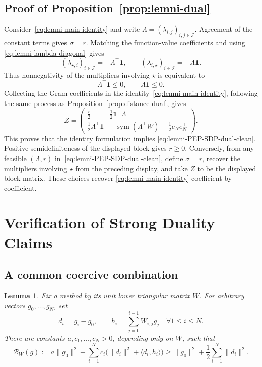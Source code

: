 \documentclass[11pt]{article}
\newtheorem{lemma}[thm]{Lemma}
\begin{document}
\subsection{Proof of Proposition~\ref{prop:lemni-dual}}
\label{app:lemni-dual}
Consider~\eqref{eq:lemni-main-identity} and write
$\Lambda=(\lambda_{i,j})_{i,j\in\mathcal I}$. Agreement of the constant terms
gives $\sigma=r$. Matching the function-value coefficients and using
\eqref{eq:lemni-lambda-diagonal} gives
\[
    (\lambda_{\star,i})_{i\in\mathcal I}
    =-\Lambda^\top\mathbf1,
    \qquad
    (\lambda_{i,\star})_{i\in\mathcal I}
    =-\Lambda\mathbf1.
\]
Thus nonnegativity of the multipliers involving $\star$ is equivalent to
\[
    \Lambda^\top\mathbf1\leq0,
    \qquad
    \Lambda\mathbf1\leq0.
\]
Collecting the Gram coefficients in the identity~\eqref{eq:lemni-main-identity}, following the same process as Proposition~\ref{prop:distance-dual}, gives
\[
Z=
\begin{pmatrix}
    \frac r2 & \frac12\mathbf1^\top\Lambda\\[1mm]
    \frac12\Lambda^\top\mathbf1
    &-\operatorname{sym}(\Lambda^\top W)-\frac12e_Ne_N^\top
\end{pmatrix}.
\]
This proves that the identity formulation implies
\eqref{eq:lemni-PEP-SDP-dual-clean}. Positive semidefiniteness of the
displayed block gives $r\geq0$. Conversely, from any feasible $(\Lambda,r)$
in~\eqref{eq:lemni-PEP-SDP-dual-clean}, define $\sigma=r$,
recover the multipliers involving $\star$ from the preceding display, and
take $Z$ to be the displayed block matrix. These choices recover
\eqref{eq:lemni-main-identity} coefficient by coefficient.



\section{Verification of Strong Duality Claims}
\subsection{A common coercive combination}

\begin{lemma}\label{lem:app-coercive-combination}
Fix a method by its unit lower triangular matrix $W$. For arbitrary vectors
$g_0,\ldots,g_N$, set
\[
 d_i=g_i-g_0,
 \qquad
 h_i=\sum_{j=0}^{i-1}W_{i,j}g_j
 \quad \forall 1\le i\le N.
\]
There are constants $a,c_1,\ldots,c_N>0$, depending only on $W$, such that
\begin{equation}\label{eq:app-positive-form}
 \mathcal B_W(g):=
 a\|g_0\|^2+
 \sum_{i=1}^Nc_i\bigl(\|d_i\|^2+\langle d_i,h_i\rangle\bigr)
 \ge \|g_0\|^2+\frac12\sum_{i=1}^N\|d_i\|^2.
\end{equation}
\end{lemma}
\end{document}
